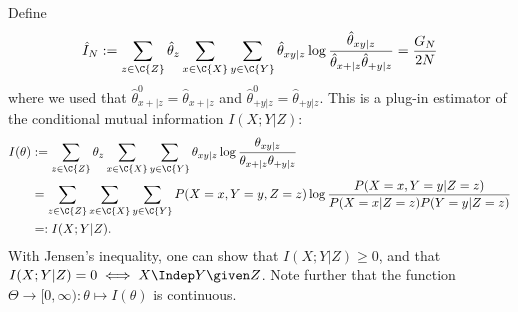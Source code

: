 Define
$$\hat I_N := \sum_{z\in\C{Z}} \hat\theta_{z} \sum_{x\in\C{X}} \sum_{y\in\C{Y}} \hat \theta_{xy|z} \log \frac{\hat \theta_{xy|z}}{\hat \theta_{x+|z} \hat \theta_{+ y|z}}
    = \frac{G_N}{2N}$$
where we used that $\hat\theta^0_{x +|z} = \hat\theta_{x +|z}$ and $\hat\theta^0_{+ y|z} = \hat\theta_{+ y|z}$.
This is a plug-in estimator of the conditional mutual information $I(X;Y|Z)$:
\begin{equation*}\begin{split}
  I(\theta) 
  & := \sum_{z\in\C{Z}} \theta_z \sum_{x\in\C{X}}\sum_{y\in\C{Y}} \theta_{xy|z} \log \frac{\theta_{xy|z}}{\theta_{x +|z} \theta_{+ y|z}} \\
  & = \sum_{z\in\C{Z}} \sum_{x\in\C{X}} \sum_{y\in\C{Y}} P(X=x,Y=y,Z=z) \log \frac{P(X=x,Y=y|Z=z)}{P(X=x|Z=z) P(Y=y|Z=z)} \\
  & =: I(X;Y|Z).
\end{split}\end{equation*}
With Jensen's inequality, one can show that $I(X;Y|Z) \ge 0$, and that $I(X;Y|Z) = 0 \iff X \Indep Y \given Z$.
Note further that the function $\Theta \to [0,\infty) : \theta \mapsto I(\theta)$ is continuous.

